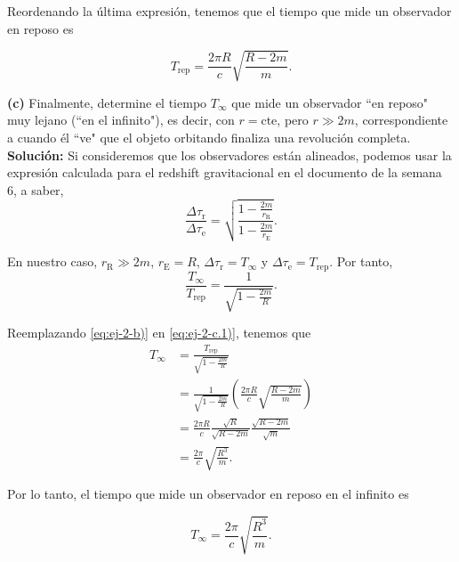 \documentclass[letterpaper,11pt]{article}
\begin{document}
Reordenando la última expresión, tenemos que el tiempo que mide un observador en reposo es 
\begin{shaded}
\begin{equation}
T_{\text{rep}} = \frac{2\pi R}{c} \sqrt{\frac{R-2m}{m}}. \label{eq:ej-2-b)}
\end{equation}
\end{shaded}

\textbf{(c)} Finalmente, determine el tiempo $T_{\infty}$ que mide un observador ``en reposo" muy lejano (``en el infinito"), es decir, con $r = \text{cte}$, pero $r \gg 2m$, correspondiente a cuando él ``ve" que el objeto orbitando finaliza una revolución completa.
\\

\textbf{Solución:} Si consideremos que los observadores están alineados, podemos usar la expresión calculada para el redshift gravitacional en el documento de la semana 6, a saber,
\begin{equation}
\frac{\Delta \tau_\text{r}}{\Delta \tau_{\text{e}}} = \sqrt{\frac{1 - \frac{2m}{r_{\text{R}}}}{1 - \frac{2m}{r_{\text{E}}}}}.
\end{equation}

En nuestro caso, $r_{\text{R}} \gg 2m$, $r_{\text{E}} = R$, $\Delta \tau_\text{r} = T_{\infty}$ y $\Delta \tau_\text{e} = T_{\text{rep}}$. Por tanto,
\begin{equation}
\frac{T_{\infty}}{T_{\text{rep}}} = \frac{1}{\sqrt{1 - \frac{2m}{R}}}. \label{eq:ej-2-c.1)}
\end{equation}

Reemplazando \eqref{eq:ej-2-b)} en \eqref{eq:ej-2-c.1)}, tenemos que
\begin{align}
T_{\infty} &= \frac{T_{\text{rep}}}{\sqrt{1 - \frac{2m}{R}}} \nonumber \\
&= \frac{1}{\sqrt{1 - \frac{2m}{R}}} \left( \frac{2\pi R}{c} \sqrt{\frac{R-2m}{m}} \right) \nonumber \\
&= \frac{2\pi R}{c}\frac{\sqrt{R}}{\sqrt{R-2m}} \frac{\sqrt{R-2m}}{\sqrt{m}} \nonumber \\
&= \frac{2\pi}{c} \sqrt{\frac{R^3}{m}}.
\end{align}

Por lo tanto, el tiempo que mide un observador en reposo en el infinito es 
\begin{shaded}
\begin{equation}
T_{\infty} = \frac{2\pi}{c} \sqrt{\frac{R^3}{m}}.
\end{equation}
\end{shaded}
\end{document}
